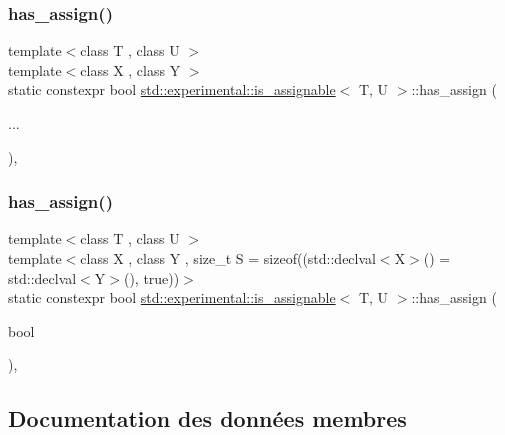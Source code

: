 \subsubsection{\texorpdfstring{has\+\_\+assign()}{has\_assign()}\hspace{0.1cm}{\footnotesize\ttfamily [1/2]}}
{\footnotesize\ttfamily template$<$class T , class U $>$ \\
template$<$class X , class Y $>$ \\
static constexpr bool \hyperlink{structstd_1_1experimental_1_1is__assignable}{std\+::experimental\+::is\+\_\+assignable}$<$ T, U $>$\+::has\+\_\+assign (\begin{DoxyParamCaption}\item[{}]{... }\end{DoxyParamCaption})\hspace{0.3cm}{\ttfamily [inline]}, {\ttfamily [static]}}

\mbox{\label{structstd_1_1experimental_1_1is__assignable_a826902a90f85d2a25cbab409ebe1aff6}} 
\subsubsection{\texorpdfstring{has\+\_\+assign()}{has\_assign()}\hspace{0.1cm}{\footnotesize\ttfamily [2/2]}}
{\footnotesize\ttfamily template$<$class T , class U $>$ \\
template$<$class X , class Y , size\+\_\+t S = sizeof((std\+::declval$<$\+X$>$() = std\+::declval$<$\+Y$>$(), true))$>$ \\
static constexpr bool \hyperlink{structstd_1_1experimental_1_1is__assignable}{std\+::experimental\+::is\+\_\+assignable}$<$ T, U $>$\+::has\+\_\+assign (\begin{DoxyParamCaption}\item[{bool}]{ }\end{DoxyParamCaption})\hspace{0.3cm}{\ttfamily [inline]}, {\ttfamily [static]}}



\subsection{Documentation des données membres}
\mbox{\label{structstd_1_1experimental_1_1is__assignable_a670223830052ed42e41e453386027b45}} 
